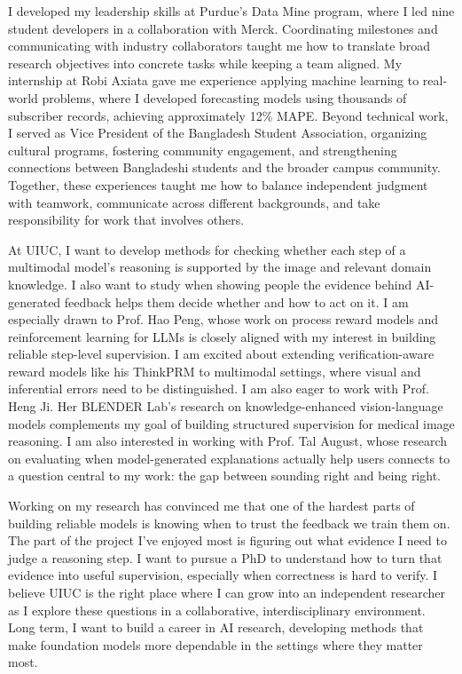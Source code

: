 \documentclass{article}
\begin{document}
I developed my leadership skills at Purdue's Data Mine program, where I led nine student developers in a collaboration with Merck. Coordinating milestones and communicating with industry collaborators taught me how to translate broad research objectives into concrete tasks while keeping a team aligned. My internship at Robi Axiata gave me experience applying machine learning to real-world problems, where I developed forecasting models using thousands of subscriber records, achieving approximately 12\% MAPE. Beyond technical work, I served as Vice President of the Bangladesh Student Association, organizing cultural programs, fostering community engagement, and strengthening connections between Bangladeshi students and the broader campus community. Together, these experiences taught me how to balance independent judgment with teamwork, communicate across different backgrounds, and take responsibility for work that involves others.


At UIUC, I want to develop methods for checking whether each step of a multimodal model's reasoning is supported by the image and relevant domain knowledge. I also want to study when showing people the evidence behind AI-generated feedback helps them decide whether and how to act on it. I am especially drawn to Prof. Hao Peng, whose work on process reward models and reinforcement learning for LLMs is closely aligned with my interest in building reliable step-level supervision. I am excited about extending verification-aware reward models like his ThinkPRM to multimodal settings, where visual and inferential errors need to be distinguished. I am also eager to work with Prof. Heng Ji. Her BLENDER Lab's research on knowledge-enhanced vision-language models complements my goal of building structured supervision for medical image reasoning. I am also interested in working with Prof. Tal August, whose research on evaluating when model-generated explanations actually help users connects to a question central to my work: the gap between sounding right and being right.



Working on my research has convinced me that one of the hardest parts of building reliable models is knowing when to trust the feedback we train them on. The part of the project I've enjoyed most is figuring out what evidence I need to judge a reasoning step. I want to pursue a PhD to understand how to turn that evidence into useful supervision, especially when correctness is hard to verify. I believe UIUC is the right place where I can grow into an independent researcher as I explore these questions in a collaborative, interdisciplinary environment. Long term, I want to build a career in AI research, developing methods that make foundation models more dependable in the settings where they matter most.
\end{document}
